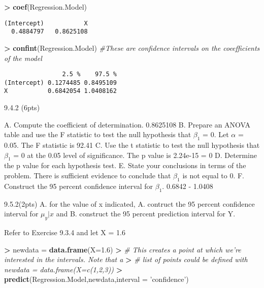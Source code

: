 \documentclass[]{article}
\newenvironment{Shaded}{\begin{snugshade}}{\end{snugshade}}
\newcommand{\KeywordTok}[1]{\textcolor[rgb]{0.13,0.29,0.53}{\textbf{#1}}}
\newcommand{\DataTypeTok}[1]{\textcolor[rgb]{0.13,0.29,0.53}{#1}}
\newcommand{\FloatTok}[1]{\textcolor[rgb]{0.00,0.00,0.81}{#1}}
\newcommand{\StringTok}[1]{\textcolor[rgb]{0.31,0.60,0.02}{#1}}
\newcommand{\CommentTok}[1]{\textcolor[rgb]{0.56,0.35,0.01}{\textit{#1}}}
\newcommand{\OperatorTok}[1]{\textcolor[rgb]{0.81,0.36,0.00}{\textbf{#1}}}
\newcommand{\ErrorTok}[1]{\textcolor[rgb]{0.64,0.00,0.00}{\textbf{#1}}}
\newcommand{\NormalTok}[1]{#1}
\begin{document}
\begin{Shaded}
\begin{Highlighting}[]
\OperatorTok{>}\StringTok{ }\KeywordTok{coef}\NormalTok{(Regression.Model)}
\end{Highlighting}
\end{Shaded}

\begin{verbatim}
(Intercept)           X 
  0.4884797   0.8625108 
\end{verbatim}

\begin{Shaded}
\begin{Highlighting}[]
\OperatorTok{>}\StringTok{ }\KeywordTok{confint}\NormalTok{(Regression.Model) }\CommentTok{#These are confidence intervals on the coeefficients of the model}
\end{Highlighting}
\end{Shaded}

\begin{verbatim}
                2.5 %    97.5 %
(Intercept) 0.1274485 0.8495109
X           0.6842054 1.0408162
\end{verbatim}

9.4.2 (6pts)

A. Compute the coefficient of determination. 0.8625108 B. Prepare an
ANOVA table and use the F statistic to test the null hypothesis that
\(\beta_1\) = 0. Let \(\alpha\) = 0.05. The F statistic is 92.41 C. Use
the t statistic to test the null hypothesis that \(\beta_1\) = 0 at the
0.05 level of significance. The p value is 2.24e-15 = 0 D. Determine the
p value for each hypothesis test. E. State your conclusions in terms of
the problem. There is sufficient evidence to conclude that \(\beta_1\)
is not equal to 0. F. Construct the 95 percent confidence interval for
\(\beta_1\). 0.6842 - 1.0408

9.5.2(2pts) A. for the value of x indicated, A. contruct the 95 percent
confidence interval for \(\mu_y|x\) and B. construct the 95 percent
prediction interval for Y.

Refer to Exercise 9.3.4 and let X = 1.6

\begin{Shaded}
\begin{Highlighting}[]
\OperatorTok{>}\StringTok{ }\NormalTok{newdata =}\StringTok{ }\KeywordTok{data.frame}\NormalTok{(}\DataTypeTok{X=}\FloatTok{1.6}\NormalTok{) }
\OperatorTok{>}\StringTok{ }\CommentTok{# This creates a point at which we're interested in the intervals. Note that a }
\ErrorTok{>}\StringTok{ }\CommentTok{# list of points could be defined with newdata = data.frame(X=c(1,2,3))}
\ErrorTok{>}\StringTok{ }\KeywordTok{predict}\NormalTok{(Regression.Model,newdata,}\DataTypeTok{interval =} \StringTok{'confidence'}\NormalTok{)}
\end{Highlighting}
\end{Shaded}
\end{document}
